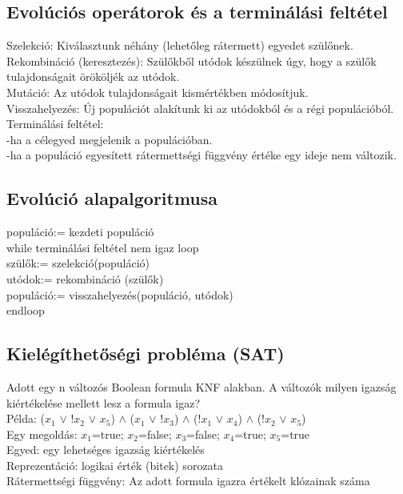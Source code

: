 \documentclass{article}
\begin{document}
	 \subsection{Evolúciós operátorok és a terminálási feltétel}
	 Szelekció: Kiválasztunk néhány (lehetőleg rátermett) egyedet szülőnek.\\
	 Rekombináció (keresztezés): Szülőkből utódok készülnek úgy, hogy a szülők tulajdonságait örököljék az utódok.\\
	 Mutáció: Az utódok tulajdonságait kismértékben módosítjuk.\\
	 Visszahelyezés: Új populációt alakítunk ki az utódokból és a régi populációból.\\
	 Terminálási feltétel: \\
	 -ha a célegyed megjelenik a populációban.\\
	 -ha a populáció egyesített rátermettségi függvény értéke egy ideje nem változik.\\
	 
	 \subsection{Evolúció alapalgoritmusa}
	 populáció:= kezdeti populáció\\
	 while terminálási feltétel nem igaz loop\\
	 \hspace*{1em} szülők:= szelekció(populáció)\\
	 \hspace*{1em} utódok:= rekombináció (szülők)\\
	 \hspace*{1em} populáció:= visszahelyezés(populáció, utódok)\\
	 endloop\\
	 
	 \subsection{Kielégíthetőségi probléma (SAT)}
	 Adott egy n változós Boolean formula KNF alakban. A változók milyen igazság kiértékelése mellett lesz a formula igaz?\\
	 Példa: ($x_1$ $\vee$ !$x_2$ $\vee$ $x_5$) $\wedge$ ($x_1$ $\vee$ !$x_3$) $\wedge$ (!$x_1$ $\vee$ $x_4$) $\wedge$ (!$x_2$ $\vee$ $x_5$)\\
	 Egy megoldás: $x_1$=true; $x_2$=false; $x_3$=false; $x_4$=true; $x_5$=true\\
	 Egyed: egy lehetséges igazság kiértékelés\\
	 Reprezentáció: logikai érték (bitek) sorozata\\
	 Rátermettségi függvény: Az adott formula igazra értékelt klózainak száma\\
	 
\end{document}
